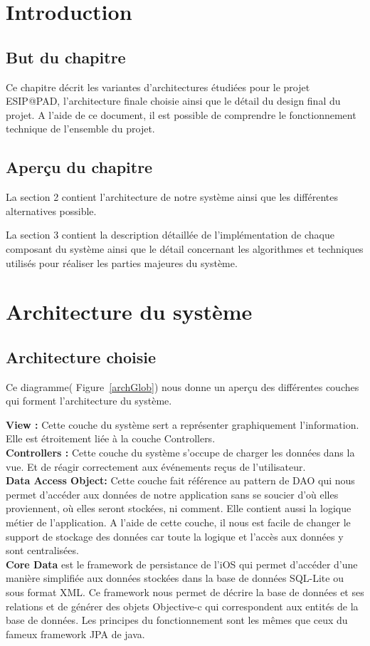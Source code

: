 \section{Introduction}
	\subsection{But du chapitre}
		Ce chapitre décrit les variantes d'architectures étudiées pour le projet ESIP@PAD, l'architecture finale choisie ainsi que le détail du design final du projet. A l'aide de ce document, il est possible de comprendre le fonctionnement technique de l'ensemble du projet.
	\subsection{Aperçu du chapitre}
	La section 2 contient l'architecture de notre système ainsi que les différentes alternatives possible. 
	
	La section 3 contient la description détaillée de l'implémentation de chaque composant du système ainsi que le détail concernant les algorithmes et techniques utilisés pour réaliser les parties majeures du système.

\section{Architecture du système }
	\subsection{Architecture choisie}	
		 Ce diagramme( Figure~\ref{archGlob}) nous donne un aperçu des différentes couches qui forment l'architecture du système.
		 
		 \textbf{View : } Cette couche du système sert a représenter graphiquement l'information. Elle est étroitement liée à la couche Controllers.\\[0.5cm]
		 \textbf{Controllers :} Cette couche du système s'occupe de charger les données dans la vue. Et de réagir correctement aux événements reçus de l'utilisateur.\\[0.5cm]
		\textbf{Data Access Object:} Cette couche fait référence au pattern  de DAO \cite{daoMsc} qui nous permet d'accéder aux données de notre application sans se soucier d'où elles proviennent, où elles seront stockées, ni comment. Elle contient aussi la logique métier de l'application. A l'aide de cette couche, il nous est facile de changer le support de stockage des données car toute la logique et l'accès aux données y sont centralisées. \\[0.5cm]
		\textbf{Core Data} est le framework de persistance de l'iOS qui permet d'accéder d'une manière simplifiée aux données stockées dans la base de données SQL-Lite ou sous format XML. Ce framework nous permet de décrire la base de données et ses relations et de générer des objets Objective-c qui correspondent aux entités de la base de données. Les principes du fonctionnement sont les mêmes que ceux du fameux framework JPA\cite{jpaNMSC} de java.


